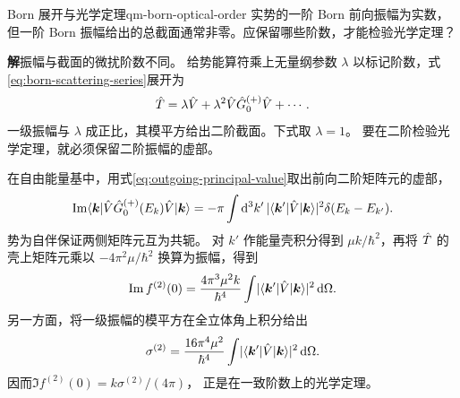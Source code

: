 \begin{example}{Born 展开与光学定理}{qm-born-optical-order}
    实势的一阶 Born 前向振幅为实数，但一阶 Born 振幅给出的总截面通常非零。应保留哪些阶数，才能检验光学定理？

    \par\smallskip\textbf{解}\quad 振幅与截面的微扰阶数不同。
    给势能算符乘上无量纲参数 $\lambda$ 以标记阶数，式\eqref{eq:born-scattering-series}展开为
    \[
        \hat{T} = \lambda\hat{V} + \lambda^2\hat{V}\hat{G}_0^{(+)}\hat{V} + \cdots .
    \]
    一级振幅与 $\lambda$ 成正比，其模平方给出二阶截面。下式取 $\lambda = 1$。
    要在二阶检验光学定理，就必须保留二阶振幅的虚部。

    在自由能量基中，用式\eqref{eq:outgoing-principal-value}取出前向二阶矩阵元的虚部，
    \begin{equation}
        \operatorname{Im}\langle\bm k\vert\hat{V}\hat{G}_0^{(+)}(E_k)\hat{V}\vert\bm k\rangle
        = -\pi\int\mathop{}\!\mathrm{d}^3k'\,
            \lvert\langle\bm k'\vert\hat{V}\vert\bm k\rangle\rvert^2\delta(E_k - E_{k'}).
    \end{equation}
    势为自伴保证两侧矩阵元互为共轭。
    对 $k'$ 作能量壳积分得到 $\mu k/\hbar^2$，再将 $\hat{T}$ 的壳上矩阵元乘以 $-4\pi^2\mu/\hbar^2$ 换算为振幅，得到
    \begin{equation}
        \operatorname{Im} f^{(2)}(0)
        = \frac{4\pi^3\mu^2k}{\hbar^4}
            \int\lvert\langle\bm k'\vert\hat{V}\vert\bm k\rangle\rvert^2\mathop{}\!\mathrm{d}\Omega.
    \end{equation}
    另一方面，将一级振幅的模平方在全立体角上积分给出
    \[
        \sigma^{(2)} = \frac{16\pi^4\mu^2}{\hbar^4}
            \int\lvert\langle\bm k'\vert\hat{V}\vert\bm k\rangle\rvert^2\mathop{}\!\mathrm{d}\Omega .
    \]
    因而$\Im f^{(2)}(0) = k\sigma^{(2)}/(4\pi)$，
    正是在一致阶数上的光学定理。
\end{example}

